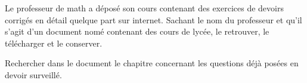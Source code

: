 
\begin{exercice}\label{exosmath-0539}

    Le professeur de math a déposé son cours contenant des exercices de devoirs corrigés en détail quelque part sur internet. Sachant le nom du professeur et qu'il s'agit d'un document nomé  contenant des cours de lycée, le retrouver, le télécharger et le conserver.

    Rechercher dans le document le chapitre concernant les questions déjà posées en devoir surveillé.

\end{exercice}
